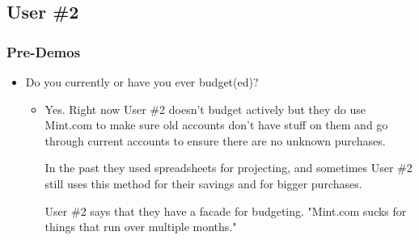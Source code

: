 \documentclass{chi2011}
\begin{document}
	\subsection{User \#2}

	\subsubsection{Pre-Demos}
	\begin{itemize}[noitemsep]
		\item Do you currently or have you ever budget(ed)?
		\begin{itemize}[noitemsep]
			\item 
				Yes. Right now User \#2 doesn't budget actively but they do use Mint.com to make sure old
				accounts don't have stuff on them and go through current accounts to ensure there are no
				unknown purchases. 
				
				In the past they used spreadsheets for projecting, and sometimes User \#2 still uses this
				method for their savings and for bigger purchases. 
				
				User \#2 says that they have a facade for budgeting. "Mint.com sucks for things that run over
				multiple months."
		\end{itemize}
	\end{itemize}
	
\end{document}
